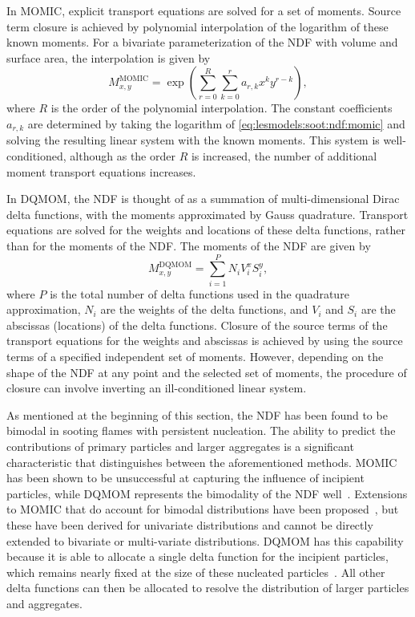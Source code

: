 In MOMIC, explicit transport equations are solved for a set of moments. Source term closure is achieved by polynomial interpolation of the logarithm of these known moments. For a bivariate parameterization of the NDF with volume and surface area, the interpolation is given by
\begin{equation}\label{eq:lesmodels:soot:ndf:momic}
  M_{x,y}^{\text{MOMIC}} = \exp\left( \sum\limits_{r=0}^{R} \sum\limits_{k=0}^{r} a_{r,k}x^k y^{r-k} \right),
\end{equation}
where $R$ is the order of the polynomial interpolation. The constant coefficients $a_{r,k}$ are determined by taking the logarithm of \cref{eq:lesmodels:soot:ndf:momic} and solving the resulting linear system with the known moments. This system is well-conditioned, although as the order $R$ is increased, the number of additional moment transport equations increases.

In DQMOM, the NDF is thought of as a summation of multi-dimensional Dirac delta functions, with the moments approximated by Gauss quadrature. Transport equations are solved for the weights and locations of these delta functions, rather than for the moments of the NDF. The moments of the NDF are given by
\begin{equation}\label{eq:lesmodels:soot:ndf:dqmom}
  M_{x,y}^{\text{DQMOM}} = \sum\limits_{i=1}^{P} N_i V_i^x S_i^y,
\end{equation}
where $P$ is the total number of delta functions used in the quadrature approximation, $N_i$ are the weights of the delta functions, and $V_i$ and $S_i$ are the abscissas (locations) of the delta functions. Closure of the source terms of the transport equations for the weights and abscissas is achieved by using the source terms of a specified independent set of moments. However, depending on the shape of the NDF at any point and the selected set of moments, the procedure of closure can involve inverting an ill-conditioned linear system.

As mentioned at the beginning of this section, the NDF has been found to be bimodal in sooting flames with persistent nucleation. The ability to predict the contributions of primary particles and larger aggregates is a significant characteristic that distinguishes between the aforementioned methods. MOMIC has been shown to be unsuccessful at capturing the influence of incipient particles, while DQMOM represents the bimodality of the NDF well~\cite{mueller2009}. Extensions to MOMIC that do account for bimodal distributions have been proposed~\cite{frenklach2002}, but these have been derived for univariate distributions and cannot be directly extended to bivariate or multi-variate distributions. DQMOM has this capability because it is able to allocate a single delta function for the incipient particles, which remains nearly fixed at the size of these nucleated particles~\cite{blanquart2009}. All other delta functions can then be allocated to resolve the distribution of larger particles and aggregates.


